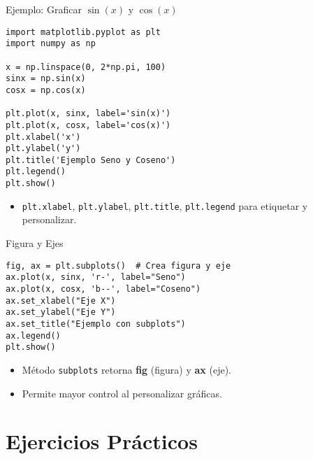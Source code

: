 \documentclass[10pt]{beamer}
\begin{document}
\begin{frame}[fragile]{Ejemplo: Graficar \(\sin(x)\) y \(\cos(x)\)}
\begin{verbatim}
import matplotlib.pyplot as plt
import numpy as np

x = np.linspace(0, 2*np.pi, 100)
sinx = np.sin(x)
cosx = np.cos(x)

plt.plot(x, sinx, label='sin(x)')
plt.plot(x, cosx, label='cos(x)')
plt.xlabel('x')
plt.ylabel('y')
plt.title('Ejemplo Seno y Coseno')
plt.legend()
plt.show()
\end{verbatim}
\begin{itemize}
  \item \texttt{plt.xlabel}, \texttt{plt.ylabel}, \texttt{plt.title}, \texttt{plt.legend} para etiquetar y personalizar.
\end{itemize}
\end{frame}

\begin{frame}[fragile]{Figura y Ejes}
\begin{verbatim}
fig, ax = plt.subplots()  # Crea figura y eje
ax.plot(x, sinx, 'r-', label="Seno")
ax.plot(x, cosx, 'b--', label="Coseno")
ax.set_xlabel("Eje X")
ax.set_ylabel("Eje Y")
ax.set_title("Ejemplo con subplots")
ax.legend()
plt.show()
\end{verbatim}
\begin{itemize}
  \item Método \texttt{subplots} retorna \textbf{fig} (figura) y \textbf{ax} (eje).
  \item Permite mayor control al personalizar gráficas.
\end{itemize}
\end{frame}

\section{Ejercicios Prácticos}
\end{document}
